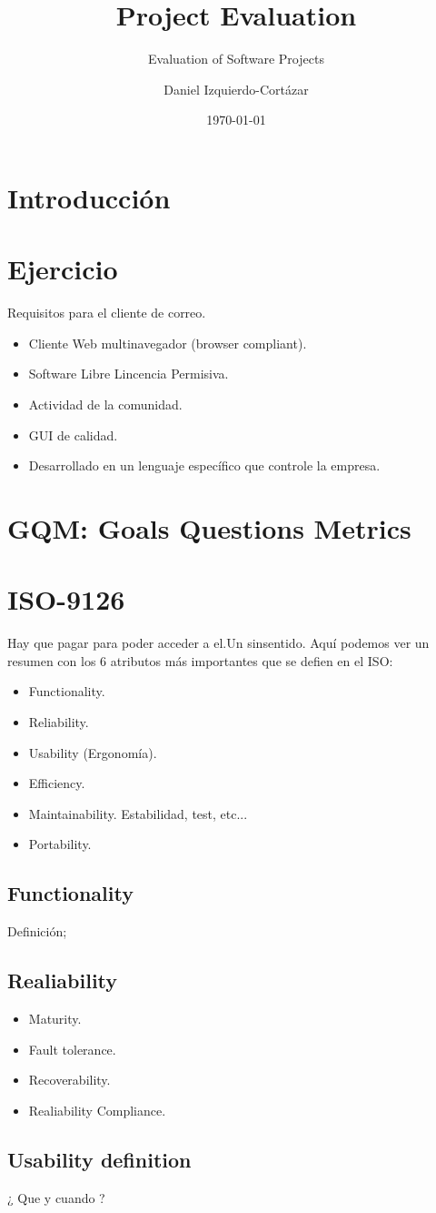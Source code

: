 \documentclass[11pt]{scrartcl}
\title{\textbf{Project Evaluation}}
\subtitle{Evaluation of Software Projects}
\author{Daniel Izquierdo-Cortázar}
\date{\today}
\begin{document}
\maketitle

\section{Introducción}

\section{Ejercicio}

Requisitos para el cliente de correo.
\begin{itemize}
    \item Cliente Web multinavegador (browser compliant).
    \item Software Libre Lincencia Permisiva.
    \item Actividad de la comunidad.
    \item GUI de calidad.
    \item Desarrollado en un lenguaje específico que controle la empresa.
\end{itemize}

\section{GQM: Goals Questions Metrics}



\section{ISO-9126}

Hay que pagar para poder acceder a el.Un sinsentido. Aquí podemos ver un resumen con los 6 atributos más importantes que se defien en el ISO:
\begin{itemize}
    \item Functionality.
    \item Reliability.
    \item Usability (Ergonomía).
    \item Efficiency.
    \item Maintainability. Estabilidad, test, etc...
    \item Portability.
\end{itemize}

\subsection{Functionality}

Definición; 

\subsection{Realiability}

\begin{itemize}
    \item Maturity.
    \item Fault tolerance.
    \item Recoverability.
    \item Realiability Compliance.
\end{itemize}

\subsection{Usability definition}

¿ Que y cuando ?
\end{document}
